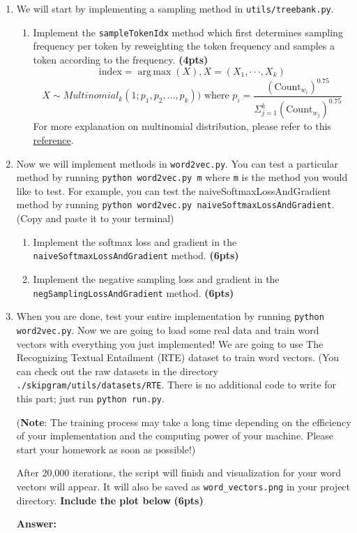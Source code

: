 \documentclass{assignment format}
\DeclareMathOperator*{\argmax}{arg\,max}
\newenvironment{answer}{
    {\bf Answer:} \begingroup\color{red}
}{\endgroup}%
\begin{document}
\begin{enumerate}[label=(\alph*)]
    \item We will start by implementing a sampling method in \texttt{utils/treebank.py}. 
        \begin{enumerate}[label=(\roman*)]
            \item Implement the \texttt{sampleTokenIdx} method which first determines sampling frequency per token by reweighting the token frequency and samples a token according to the frequency. \textbf{(4pts)}
            $$\text{index} = \argmax(X), X = (X_1, · · · , X_k)$$
            $$X \sim Multinomial_k(1; p_1, p_2, ..., p_k)) \text{ where } p_i = \frac{(\text{Count}_{w_i})^{0.75}}{\Sigma_{j=1}^{k}{(\text{Count}_{w_j})^{0.75}}}$$
            For more explanation on multinomial distribution, please refer to this \href{http://faculty.washington.edu/yenchic/20A_stat512/Lec7_Multinomial.pdf}{reference}. 
        \end{enumerate}
    \item Now we will implement methods in \texttt{word2vec.py}. You can test a particular method by running \texttt{python word2vec.py m} where \texttt{m} is the method you would like to test. For example, you can test the naiveSoftmaxLossAndGradient method by running \texttt{python word2vec.py naiveSoftmaxLossAndGradient}. (Copy and paste it to your terminal)
        \begin{enumerate}[label=(\roman*)]
        \item Implement the softmax loss and gradient in the \texttt{naiveSoftmaxLossAndGradient} method. \textbf{(6pts)}
        \item Implement the negative sampling loss and gradient in the \texttt{negSamplingLossAndGradient} method. \textbf{(6pts)}
    \end{enumerate}
    \item When you are done, test your entire implementation by running \texttt{python word2vec.py}. Now we are going to load some real data and train word vectors with everything you just implemented! We are going to use The Recognizing Textual Entailment (RTE) dataset to train word vectors. (You can check out the raw datasets in the directory \texttt{./skipgram/utils/datasets/RTE}. There is no additional code to write for this part; just run \texttt{python run.py}.

    (\textbf{Note}: The training process may take a long time depending on the efficiency of your implementation and the computing power of your machine. Please start your homework as soon as possible!)

    After 20,000 iterations, the script will finish and visualization for your word vectors will appear. It will also be saved as \texttt{word\_vectors.png} in your project directory. \textbf{Include the plot below} \textbf{(6pts)}
    
    \begin{answer}

    \end{answer}
\end{enumerate}
\end{document}
